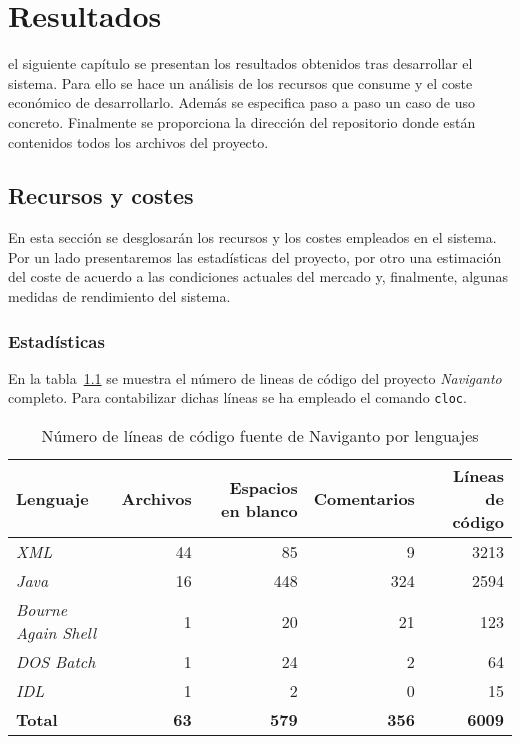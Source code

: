 \chapter{Resultados}
\label{chap:resultados}

 el siguiente capítulo se presentan los resultados obtenidos tras desarrollar el
sistema. Para ello se hace un análisis de los recursos que consume y el coste económico
de desarrollarlo. Además se especifica paso a paso un caso de uso concreto. Finalmente se
proporciona la dirección del repositorio donde están contenidos todos los archivos del proyecto.

\section{Recursos y costes}

En esta sección se desglosarán los recursos y los costes empleados en el sistema. Por un lado
presentaremos las estadísticas del proyecto, por otro una estimación del coste de acuerdo a las
condiciones actuales del mercado y, finalmente, algunas medidas de rendimiento del sistema.

\subsection{Estadísticas}

En la tabla~\ref{cuadro:lineasCodigo} se muestra el número de lineas de código del proyecto
\emph{Naviganto} completo. Para contabilizar dichas líneas se ha empleado el comando \texttt{cloc}.

\begin{table}[h]
  \centering
  \begin{tabular}{|l|r|r|r|r|}
    \hline
    \textbf{Lenguaje} & \textbf{Archivos} & \textbf{Espacios en blanco} & \textbf{Comentarios} & 
      \textbf{Líneas de código} \\
    \hline
    \emph{XML}                &          44  &           85  &             9  &          3213  \\
    \hline
    \emph{Java}               &          16  &          448  &           324  &          2594  \\
    \hline
    \emph{Bourne Again Shell} &           1  &           20  &            21  &           123  \\
    \hline
    \emph{DOS Batch}          &           1  &           24  &             2  &            64  \\
    \hline
    \emph{IDL}                &           1  &            2  &             0  &            15  \\
    \hline
    \textbf{Total}            &  \textbf{63} &  \textbf{579} &   \textbf{356} &  \textbf{6009} \\
    \hline
  \end{tabular}
  \caption{Número de líneas de código fuente de Naviganto por lenguajes}
  \label{cuadro:lineasCodigo}
\end{table} 

